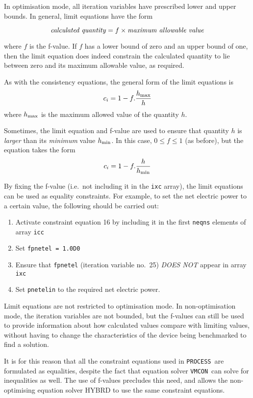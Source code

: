 \documentclass[11pt,a4paper]{report}
\newcommand{\process}{\mbox{\texttt{PROCESS}}}
\newcommand{\vmcon}{\mbox{\texttt{VMCON}}}
\begin{document}
In optimisation mode, all iteration variables have prescribed lower and upper
bounds. In general, limit equations have the form

\[ \mbox{\textit{calculated quantity}} = f \times \mbox{\textit{maximum allowable
value}} \]

where $f$ is the f-value. If $f$ has a lower bound of zero and an upper bound
of one, then the limit equation does indeed constrain the calculated quantity
to lie between zero and its maximum allowable value, as required.

As with the consistency equations, the general form of the limit equations is
\[ c_i = 1 - f.\frac{h_{\mbox{\scriptsize max}}}{h} \]
where $h_{\mbox{\scriptsize max}}$ is the maximum allowed value of the quantity $h$.

Sometimes, the limit equation and f-value are used to ensure that quantity $h$
is \textit{larger}\/ than its \textit{minimum}\/ value $h_{\mbox{\scriptsize min}}$. In
this case, $0 \leq f \leq 1$ (as before), but the equation takes the form
\[ c_i = 1 - f.\frac{h}{h_{\mbox{\scriptsize min}}} \]

By fixing the f-value (i.e.\ not including it in the \texttt{ixc} array), the
limit equations can be used as equality constraints. For example, to set the
net electric power to a certain value, the following should be carried out:
\begin{enumerate}
\item Activate constraint equation 16 by including it in the first
  \texttt{neqns} elements of array \texttt{icc}
\item Set \texttt{fpnetel = 1.0D0}
\item Ensure that \texttt{fpnetel} (iteration variable no.\ 25) \textit{DOES
    NOT}\/ appear in array \texttt{ixc}
\item Set \texttt{pnetelin} to the required net electric power.
\end{enumerate}

Limit equations are not restricted to optimisation mode. In non-optimisation
mode, the iteration variables are not bounded, but the f-values can still be
used to provide information about how calculated values compare with limiting
values, without having to change the characteristics of the device being
benchmarked to find a solution.

It is for this reason that all the constraint equations used in \process\ are
formulated as equalities, despite the fact that equation solver \vmcon\ can
solve for inequalities as well. The use of f-values precludes this need, and
allows the non-optimising equation solver HYBRD to use the same constraint
equations.
\end{document}
